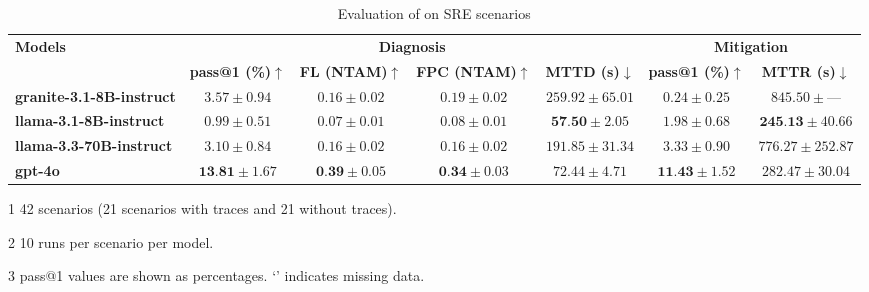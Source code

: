\begin{table*}[h]
\small
\centering
\setlength{\tabcolsep}{4pt}
\begin{threeparttable}
  \caption{Evaluation of \lumyn on SRE scenarios}
  \label{tab:sreagent-eval}
  \begin{tabular}{@{}lcccccc@{}}
    \toprule
    \multirow{2}{*}{\textbf{Models}}
      & \multicolumn{4}{c}{\textbf{Diagnosis}}
      & \multicolumn{2}{c}{\textbf{Mitigation}} \\
    \cmidrule(lr){2-5}\cmidrule(lr){6-7}
    & \textbf{pass@1 (\%)$\uparrow$}
    & \textbf{FL (NTAM)$\uparrow$}
    & \textbf{FPC (NTAM)$\uparrow$}
    & \textbf{MTTD (s)$\downarrow$}
    & \textbf{pass@1 (\%)$\uparrow$}
    & \textbf{MTTR (s)$\downarrow$}\\
    \midrule
    \textbf{granite-3.1-8B-instruct} &
    \cellcolor[gray]{0.97} $3.57 \pm 0.94$ &
    \cellcolor[gray]{0.96} $0.16 \pm 0.02$ &
    \cellcolor[gray]{0.94} $0.19 \pm 0.02$ &
    $259.92 \pm 65.01$ &
    $0.24 \pm 0.25$ &
    $845.50 \pm \text{---}$ \\
    \textbf{llama-3.1-8B-instruct} &
    $0.99 \pm 0.51$ &
    $0.07 \pm 0.01$ &
    $0.08 \pm 0.01$ &
    \cellcolor[gray]{0.85} $\textbf{57.50} \pm 2.05$ &
    \cellcolor[gray]{0.98} $1.98 \pm 0.68$ &
    \cellcolor[gray]{0.85} $\textbf{245.13} \pm 40.66$ \\
    \textbf{llama-3.3-70B-instruct} &
    \cellcolor[gray]{0.98} $3.10 \pm 0.84$ &
    \cellcolor[gray]{0.96} $0.16 \pm 0.02$ &
    \cellcolor[gray]{0.95} $0.16 \pm 0.02$ &
    \cellcolor[gray]{0.95} $191.85 \pm 31.34$ &
    \cellcolor[gray]{0.96} $3.33 \pm 0.90$ &
    \cellcolor[gray]{0.98} $776.27 \pm 252.87$ \\
    \textbf{gpt-4o} &
    \cellcolor[gray]{0.85} $\textbf{13.81} \pm 1.67$ &
    \cellcolor[gray]{0.85} $\textbf{0.39} \pm 0.05$ &
    \cellcolor[gray]{0.85} $\textbf{0.34} \pm 0.03$ &
    \cellcolor[gray]{0.86} $72.44 \pm 4.71$ &
    \cellcolor[gray]{0.85} $\textbf{11.43} \pm 1.52$ &
    \cellcolor[gray]{0.86} $282.47 \pm 30.04$ \\
    \bottomrule
  \end{tabular}
  \begin{tablenotes}
    \scriptsize
    \item[1] 42 scenarios (21 scenarios with traces and 21 without traces).
    \item[2] 10 runs per scenario per model.
    \item[3] pass@1 values are shown as percentages. `\text{---}' indicates missing data. 

\end{tablenotes}
\end{threeparttable}
\end{table*}

